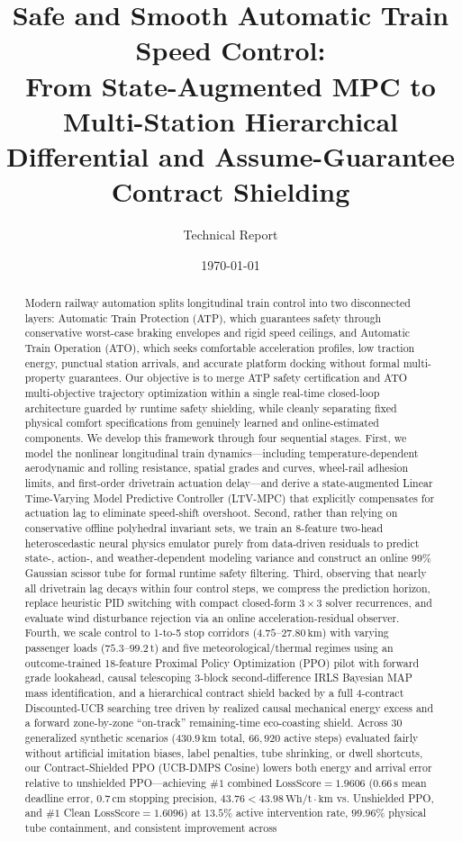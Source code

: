 \documentclass[10pt,a4paper]{article}
\title{Safe and Smooth Automatic Train Speed Control:\\
From State-Augmented MPC to Multi-Station Hierarchical\\
Differential and Assume-Guarantee Contract Shielding}
\author{Technical Report}
\date{\today}
\begin{document}
\maketitle

\begin{abstract}
Modern railway automation splits longitudinal train control into two disconnected layers: Automatic Train Protection (ATP), which guarantees safety through conservative worst-case braking envelopes and rigid speed ceilings, and Automatic Train Operation (ATO), which seeks comfortable acceleration profiles, low traction energy, punctual station arrivals, and accurate platform docking without formal multi-property guarantees. Our objective is to merge ATP safety certification and ATO multi-objective trajectory optimization within a single real-time closed-loop architecture guarded by runtime safety shielding, while cleanly separating fixed physical comfort specifications from genuinely learned and online-estimated components. We develop this framework through four sequential stages. First, we model the nonlinear longitudinal train dynamics—including temperature-dependent aerodynamic and rolling resistance, spatial grades and curves, wheel-rail adhesion limits, and first-order drivetrain actuation delay—and derive a state-augmented Linear Time-Varying Model Predictive Controller (LTV-MPC) that explicitly compensates for actuation lag to eliminate speed-shift overshoot. Second, rather than relying on conservative offline polyhedral invariant sets, we train an 8-feature two-head heteroscedastic neural physics emulator purely from data-driven residuals to predict state-, action-, and weather-dependent modeling variance and construct an online 99\% Gaussian scissor tube for formal runtime safety filtering. Third, observing that nearly all drivetrain lag decays within four control steps, we compress the prediction horizon, replace heuristic PID switching with compact closed-form $3\times 3$ solver recurrences, and evaluate wind disturbance rejection via an online acceleration-residual observer. Fourth, we scale control to 1-to-5 stop corridors ($4.75\text{--}27.80\,\text{km}$) with varying passenger loads ($75.3\text{--}99.2\,\text{t}$) and five meteorological/thermal regimes using an outcome-trained 18-feature Proximal Policy Optimization (PPO) pilot with forward grade lookahead, causal telescoping 3-block second-difference IRLS Bayesian MAP mass identification, and a hierarchical contract shield backed by a full 4-contract Discounted-UCB searching tree driven by realized causal mechanical energy excess and a forward zone-by-zone ``on-track'' remaining-time eco-coasting shield. Across 30 generalized synthetic scenarios ($430.9\,\text{km}$ total, $66,920$ active steps) evaluated fairly without artificial imitation biases, label penalties, tube shrinking, or dwell shortcuts, our Contract-Shielded PPO (UCB-DMPS Cosine) lowers both energy and arrival error relative to unshielded PPO—achieving $\#1$ combined $\text{LossScore} = 1.9606$ ($0.66\,\text{s}$ mean deadline error, $0.7\,\text{cm}$ stopping precision, $43.76 < 43.98\,\text{Wh/t}\cdot\text{km}$ vs. Unshielded PPO, and $\#1$ Clean $\text{LossScore} = 1.6096$) at $13.5\%$ active intervention rate, $99.96\%$ physical tube containment, and consistent improvement across 
\end{abstract}
\end{document}
